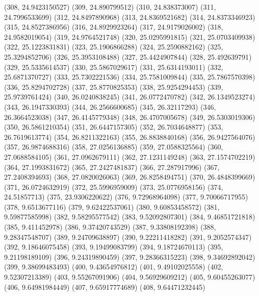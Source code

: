 {					(308, 24.9423150527)
					(309, 24.890799512)
					(310, 24.838373007)
					(311, 24.7996533699)
					(312, 24.8497890968)
					(313, 24.8369521682)
					(314, 24.8373346923)
					(315, 24.8527386956)
					(316, 24.8929923264)
					(317, 24.9179026002)
					(318, 24.9582019054)
					(319, 24.9764521748)
					(320, 25.0295991815)
					(321, 25.0703409938)
					(322, 25.1223831831)
					(323, 25.1906866288)
					(324, 25.2590882162)
					(325, 25.3294852706)
					(326, 25.3953108488)
					(327, 25.4424907844)
					(328, 25.492639791)
					(329, 25.5335614537)
					(330, 25.5867029617)
					(331, 25.6314193011)
					(332, 25.6871370727)
					(333, 25.7302221536)
					(334, 25.7581009844)
					(335, 25.7867570398)
					(336, 25.8294702728)
					(337, 25.8770825353)
					(338, 25.9254294453)
					(339, 25.9739761424)
					(340, 26.0240838245)
					(341, 26.0772470782)
					(342, 26.1349523274)
					(343, 26.1947330393)
					(344, 26.2566600685)
					(345, 26.32117293)
					(346, 26.3664523038)
					(347, 26.4145779348)
					(348, 26.4707005678)
					(349, 26.5303019306)
					(350, 26.5861210354)
					(351, 26.6447157305)
					(352, 26.7034648877)
					(353, 26.7619613774)
					(354, 26.8211322163)
					(355, 26.8838840168)
					(356, 26.9427564076)
					(357, 26.9874688316)
					(358, 27.0256136885)
					(359, 27.0588325564)
					(360, 27.0688584105)
					(361, 27.0962679111)
					(362, 27.1231149248)
					(363, 27.1574702219)
					(364, 27.1993831672)
					(365, 27.2427481837)
					(366, 27.287917996)
					(367, 27.2408394693)
					(368, 27.0820026063)
					(369, 26.8258494751)
					(370, 26.4848399669)
					(371, 26.0724632919)
					(372, 25.5996959009)
					(373, 25.0776958156)
					(374, 24.51857713)
					(375, 23.9306220622)
					(376, 9.72968964098)
					(377, 9.70066717955)
					(378, 9.6513677116)
					(379, 9.62422537061)
					(380, 9.60853458572)
					(381, 9.59877585998)
					(382, 9.58295577542)
					(383, 9.52092807301)
					(384, 9.46851721818)
					(385, 9.411452978)
					(386, 9.37420743529)
					(387, 9.33808192398)
					(388, 9.28347548707)
					(389, 9.24709638897)
					(390, 9.22211418282)
					(391, 9.2052574347)
					(392, 9.18646075458)
					(393, 9.19499083799)
					(394, 9.18724670113)
					(395, 9.21198189109)
					(396, 9.24319890459)
					(397, 9.28366315223)
					(398, 9.34692892042)
					(399, 9.38699483493)
					(400, 9.43654976812)
					(401, 9.49102025558)
					(402, 9.52307213389)
					(403, 9.55267091906)
					(404, 9.56929609212)
					(405, 9.60455263077)
					(406, 9.64981984449)
					(407, 9.65917774689)
					(408, 9.64471232445)
}
